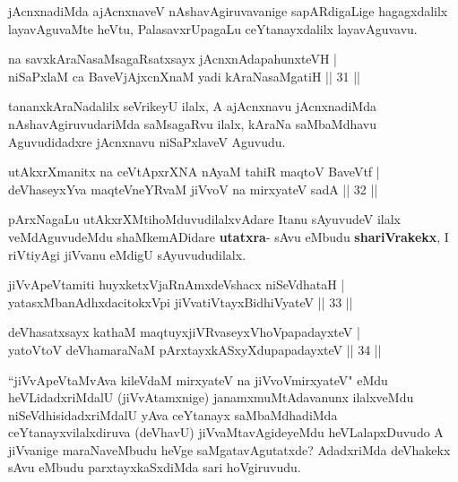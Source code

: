 \begin{artha}
jAcnxnadiMda ajAcnxnaveV nAshavAgiruvavanige  sapARdigaLige hagagxdalilx layavAguvaMte heVtu, PalasavxrUpagaLu ceYtanayxdalilx 
laya\-vAguvavu.
\end{artha}

\begin{shl}
na savxkAraNasaMsagaRsatxsayx jAcnxnAdapahunxteVH |\\
niSaPxlaM ca BaveVjAjxcnXnaM yadi kAraNasaMgatiH \hfill || 31 ||
\end{shl}

\begin{artha}
tananxkAraNadalilx seVrikeyU ilalx, A  ajAcnxnavu jAcnxnadiMda 
nAshavAgiruvudariMda saMsagaRvu ilalx, kAraNa saMbaMdhavu Aguvudidadxre jAcnxnavu 
niSaPxlaveV Aguvudu.
\end{artha}

\begin{shl}
utAkxrXmanitx na ceVtApxrXNA nAyaM tahiR maqtoV BaveVtf |\\
deVhaseyxYva maqteVneYRvaM jiVvoV na mirxyateV sadA \hfill || 32 ||
\end{shl}

\begin{artha}
pArxNagaLu utAkxrXMtihoMduvudilalxvAdare Itanu sAyuvudeV ilalx veMdAguvudeMdu shaMkemADidare \textbf{utatxra}- sAvu eMbudu \textbf{shariVrakekx}, I riVtiyAgi jiVvanu eMdigU sAyuvududilalx. 
\end{artha}


\begin{shl}
jiVvApeVtamiti huyxketxVjaRnAmxdeVshacx niSeVdhataH |\\
yatasxMbanAdhxdacitokxV\s pi jiVvatiVtayxBidhiVyateV \hfill || 33 ||
\end{shl}

\begin{shl}
deVhasatxsayx kathaM maqtuyxjiVRvaseyxVhoVpapadayxteV |\\
yatoV\s toV deVhamaraNaM pArxtayxkASxyXdupapadayxteV \hfill || 34 ||
\end{shl}

\begin{artha}
``jiVvApeVtaMvAva kileVdaM mirxyateV na jiVvoVmirxyateV" eMdu heVLidadxriMdalU (jiVvAtamxnige) janamxmuMtAdavanunx ilalxveMdu niSeVdhisidadxriMdalU yAva ceYtanayx saMbaMdhadiMda ceYtanayxvilalxdiruva (deVhavU) 
jiVvaMtavAgideyeMdu heVLalapxDuvudo A jiVvanige maraNaveMbudu heVge 
saMgatavAgutatxde? AdadxriMda deVhakekx sAvu eMbudu parxtayxkaSxdiMda sari hoVgiruvudu.
\end{artha}

